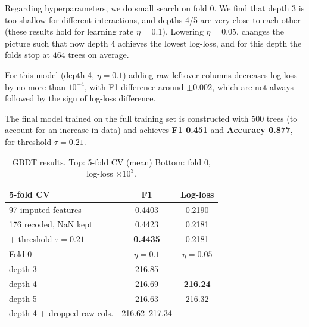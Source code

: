 \documentclass[10pt,conference,compsocconf]{IEEEtran}
\begin{document}
Regarding hyperparameters, we do small search on fold 0. We find that depth 3 is too shallow for different interactions, and depths 4/5 are very close to each other (these results hold for learning rate $\eta = 0.1$). Lowering $\eta = 0.05$, changes the picture such that now depth 4 achieves the lowest log-loss, and for this depth the folds stop at $464$ trees on average.

For this model (depth 4, $\eta = 0.1$) adding raw leftover columns decreases log-loss by no more than $10^{-4}$, with F1 difference around $\pm 0.002$, which are not always followed by the sign of log-loss difference.

The final model trained on the full training set is constructed with $500$ trees (to account for an increase in data) and achieves \textbf{F1 0.451} and \textbf{Accuracy 0.877}, for threshold $\tau = 0.21$.

\begin{table}[tbp]
  \centering
  \footnotesize
  \caption{GBDT results. Top: 5-fold CV (mean)
  Bottom: fold 0, log-loss $\times10^3$.}
  \label{tab:gbdt}
  \setlength{\tabcolsep}{4pt}
  \begin{tabular}{@{}lcc@{}}
    \toprule
    5-fold CV & F1 & Log-loss \\
    \midrule
    97 imputed features & 0.4403 & 0.2190 \\
    176 recoded, NaN kept & 0.4423 & 0.2181 \\
    \quad + threshold $\tau=0.21$ & \textbf{0.4435} & 0.2181 \\
    \midrule
    Fold 0 & $\eta=0.1$ & $\eta=0.05$ \\
    \midrule
    depth 3 & 216.85 & -- \\
    depth 4 & 216.69 & \textbf{216.24} \\
    depth 5 & 216.63 & 216.32 \\
    depth 4 + dropped raw cols. & 216.62--217.34 & -- \\
    \bottomrule
  \end{tabular}
\end{table}



\end{document}
